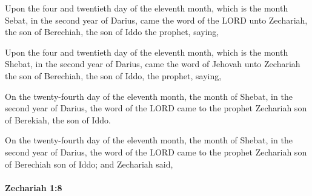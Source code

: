 			Upon the four and twentieth day of the eleventh month, which is the month Sebat, in the second year of Darius, came the word of the LORD unto Zechariah, the son of Berechiah, the son of Iddo the prophet, saying,

			\begin{versebox}
					\item[BHS] 
					\item[LXX] 
					\item[ASV] Upon the four and twentieth day of the eleventh month, which is the month Shebat, in the second year of Darius, came the word of Jehovah unto Zechariah the son of Berechiah, the son of Iddo, the prophet, saying,
					\item[NIV] On the twenty-fourth day of the eleventh month, the month of Shebat, in the second year of Darius, the word of the LORD came to the prophet Zechariah son of Berekiah, the son of Iddo.
					\item[NRSV] On the twenty-fourth day of the eleventh month, the month of Shebat, in the second year of Darius, the word of the LORD came to the prophet Zechariah son of Berechiah son of Iddo; and Zechariah said,
			\end{versebox}

		\paragraph{Zechariah 1:8} %
			\label{ZECHARIAH-1-8}

